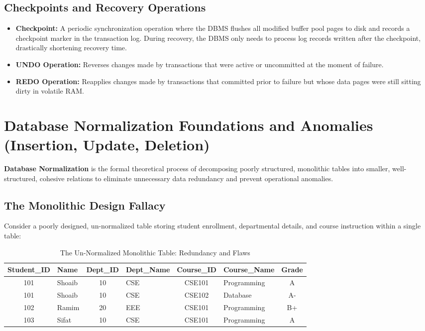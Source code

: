 \subsection{Checkpoints and Recovery Operations}

\begin{itemize}
\item \textbf{Checkpoint:} A periodic synchronization operation where the DBMS flushes all modified buffer pool pages to disk and records a checkpoint marker in the transaction log. During recovery, the DBMS only needs to process log records written after the checkpoint, drastically shortening recovery time.
\item \textbf{UNDO Operation:} Reverses changes made by transactions that were active or uncommitted at the moment of failure.
\item \textbf{REDO Operation:} Reapplies changes made by transactions that committed prior to failure but whose data pages were still sitting dirty in volatile RAM.
\end{itemize}



\newpage
\section{Database Normalization Foundations and Anomalies (Insertion, Update, Deletion)}

\textbf{Database Normalization} is the formal theoretical process of decomposing poorly structured, monolithic tables into smaller, well-structured, cohesive relations to eliminate unnecessary data redundancy and prevent operational anomalies.

\subsection{The Monolithic Design Fallacy}

Consider a poorly designed, un-normalized table storing student enrollment, departmental details, and course instruction within a single table:

\begin{table}[htbp]
\centering
\caption{The Un-Normalized Monolithic Table: Redundancy and Flaws}
\label{tab:unnormalized_table}
\begin{tabularx}{\textwidth}{c X c X c X c}
\toprule
\textbf{Student\_ID} & \textbf{Name} & \textbf{Dept\_ID} & \textbf{Dept\_Name} & \textbf{Course\_ID} & \textbf{Course\_Name} & \textbf{Grade} \\
\midrule
101 & Shoaib & 10 & CSE & CSE101 & Programming & A \\
101 & Shoaib & 10 & CSE & CSE102 & Database & A- \\
102 & Ramim & 20 & EEE & CSE101 & Programming & B+ \\
103 & Sifat & 10 & CSE & CSE101 & Programming & A \\
\bottomrule
\end{tabularx}
\end{table}

